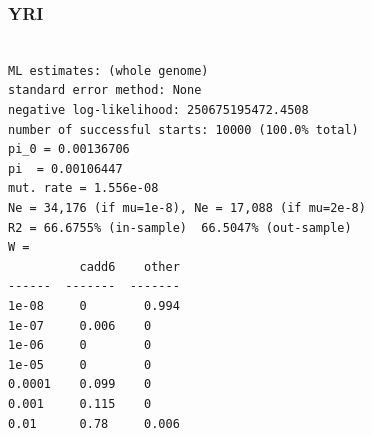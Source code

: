 \documentclass[11pt]{article}
\begin{document}
\subsubsection*{YRI}
\begin{minipage}{\linewidth}\begin{footnotesize}
\begin{verbatim}

ML estimates: (whole genome)
standard error method: None
negative log-likelihood: 250675195472.4508
number of successful starts: 10000 (100.0% total)
pi_0 = 0.00136706
pi  = 0.00106447
mut. rate = 1.556e-08 
Ne = 34,176 (if mu=1e-8), Ne = 17,088 (if mu=2e-8)
R2 = 66.6755% (in-sample)  66.5047% (out-sample)
W = 
          cadd6    other
------  -------  -------
1e-08     0        0.994
1e-07     0.006    0
1e-06     0        0
1e-05     0        0
0.0001    0.099    0
0.001     0.115    0
0.01      0.78     0.006
\end{verbatim}
\end{footnotesize}\end{minipage}



\printbibliography
\end{document}
